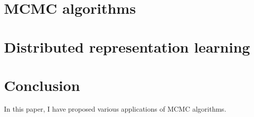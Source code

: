 \documentclass[12pt,leqno]{report}
\begin{document}
\begin{CJK}{UTF8}{cyberbit}
\chapter{MCMC algorithms}
\label{chap:MCMC}

\break

%

%

\chapter{Distributed representation learning}
\label{chap:embedding}

\break

%
\chapter{Conclusion}
\label{chap:conclusion}
In this paper, I have proposed various applications of MCMC algorithms.
\break



\appendix
\end{CJK}
\end{document}
